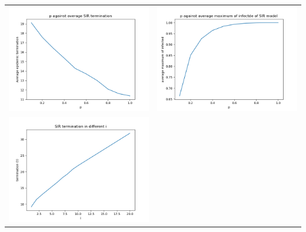 \documentclass{subfile}
\begin{document}
  \begin{tabular}{cc}
    \includegraphics[scale=0.5]{p_sir_t} & \includegraphics[scale=0.5]{p_infect_sir}\\
    \includegraphics[scale=0.5]{sir_termin_i}&\\
  \end{tabular}
\end{document}
